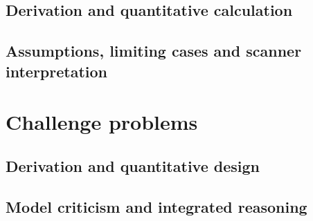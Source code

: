 \subsection{Derivation and quantitative calculation}
\subsection{Assumptions, limiting cases and scanner interpretation}

\section{Challenge problems}
\label{sec:14:challenge-problems}
\subsection{Derivation and quantitative design}
\subsection{Model criticism and integrated reasoning}

